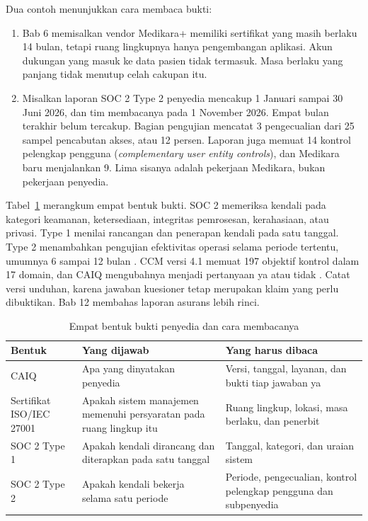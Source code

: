 Dua contoh menunjukkan cara membaca bukti:
\begin{enumerate}
  \item Bab 6 memisalkan vendor Medikara+ memiliki sertifikat yang masih berlaku 14 bulan, tetapi
  ruang lingkupnya hanya pengembangan aplikasi. Akun dukungan yang masuk ke data pasien tidak
  termasuk. Masa berlaku yang panjang tidak menutup celah cakupan itu.
  \item Misalkan laporan SOC 2 Type 2 penyedia mencakup 1 Januari sampai 30 Juni 2026, dan tim
  membacanya pada 1 November 2026. Empat bulan terakhir belum tercakup. Bagian pengujian mencatat 3
  pengecualian dari 25 sampel pencabutan akses, atau 12 persen. Laporan juga memuat 14 kontrol
  pelengkap pengguna (\textit{complementary user entity controls}), dan Medikara baru menjalankan 9.
  Lima sisanya adalah pekerjaan Medikara, bukan pekerjaan penyedia.
\end{enumerate}

Tabel~\ref{tab:ch09-asurans} merangkum empat bentuk bukti. SOC 2 memeriksa kendali pada kategori
keamanan, ketersediaan, integritas pemrosesan, kerahasiaan, atau privasi. Type 1 menilai rancangan
dan penerapan kendali pada satu tanggal. Type 2 menambahkan pengujian efektivitas operasi selama
periode tertentu, umumnya 6 sampai 12 bulan \cite{c09-deloitte-soc}. CCM versi 4.1 memuat 197
objektif kontrol dalam 17 domain, dan CAIQ mengubahnya menjadi pertanyaan ya atau tidak
\cite{c09-ccm}. Catat versi unduhan, karena jawaban kuesioner tetap merupakan klaim yang perlu
dibuktikan. Bab 12 membahas laporan asurans lebih rinci.

\begin{table}[!htb]
  \centering\small
  \caption{Empat bentuk bukti penyedia dan cara membacanya}\label{tab:ch09-asurans}
  \begin{tabularx}{\textwidth}{|>{\raggedright\arraybackslash}p{}|>{\raggedright\arraybackslash}X|>{\raggedright\arraybackslash}X|}
    \hline
    \textbf{Bentuk} & \textbf{Yang dijawab} & \textbf{Yang harus dibaca} \\ \hline
    CAIQ & Apa yang dinyatakan penyedia & Versi, tanggal, layanan, dan bukti tiap jawaban ya \\
    \hline
    Sertifikat ISO/IEC 27001 & Apakah sistem manajemen memenuhi persyaratan pada ruang lingkup itu
    & Ruang lingkup, lokasi, masa berlaku, dan penerbit \\ \hline
    SOC 2 Type 1 & Apakah kendali dirancang dan diterapkan pada satu tanggal & Tanggal, kategori,
    dan uraian sistem \\ \hline
    SOC 2 Type 2 & Apakah kendali bekerja selama satu periode & Periode, pengecualian, kontrol
    pelengkap pengguna dan subpenyedia \\ \hline
  \end{tabularx}
\end{table}

